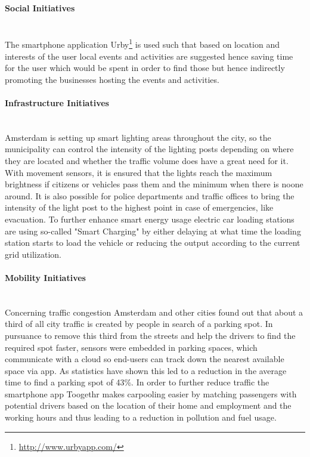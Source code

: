 \documentclass[a4paper,12pt]{report}
\begin{document}
		\paragraph{Social Initiatives} \hfill \\
		The smartphone application Urby\footnote{\url{http://www.urbyapp.com/}} is used such that based on location and interests of the user local events and activities are suggested hence saving time for the user which would be spent in order to find those but hence indirectly promoting the businesses hosting the events and activities.
		\paragraph{Infrastructure Initiatives \cite{SmartCityAmsterdamYT}} \hfill \\
		Amsterdam is setting up smart lighting areas throughout the city, so the municipality can control the intensity of the lighting posts depending on where they are located and whether the traffic volume does have a great need for it. 
		With movement sensors, it is ensured that the lights reach the maximum brightness if citizens or vehicles pass them and the minimum when there is noone around. 
		It is also possible for police departments and traffic offices to bring the intensity of the light post to the highest point in case of emergencies, like evacuation. 
		To further enhance smart energy usage electric car loading stations are using so-called "Smart Charging" by either delaying at what time the loading station starts to load the vehicle or reducing the output according to the current grid utilization.
		\paragraph{Mobility Initiatives} \hfill \label{AmsterdamMobilityInitiatives} \\
		Concerning traffic congestion Amsterdam and other cities found out that about a third of all city traffic is created by people in search of a parking spot. 
		In pursuance to remove this third from the streets and help the drivers to find the required spot faster, sensors were embedded in parking spaces, which communicate with a cloud so end-users can track down the nearest available space via app. 
		As statistics have shown this led to a reduction in the average time to find a parking spot of 43\%. 
		In order to further reduce traffic the smartphone app Toogethr makes carpooling easier by matching passengers with potential drivers based on the location of their home and employment and the working hours and thus leading to a reduction in pollution and fuel usage.
		
\end{document}
